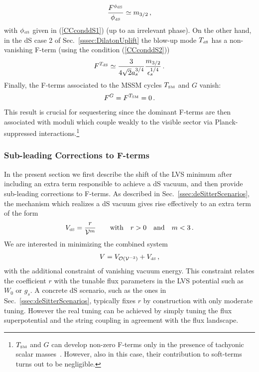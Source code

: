 \documentclass[12pt,a4paper]{book}
\def\SM{{\scriptscriptstyle \rm SM}}
\def\dS{{\scriptscriptstyle \rm dS}}
\newcommand{\mc}{\mathcal}
\begin{document}
\begin{align}
\frac{F^{\phi_\dS}}{\phi_\dS} \simeq m_{3/2}\,,
\end{align}
with $\phi_\dS$ given in (\ref{CCconddS1}) (up to an irrelevant phase). On the other hand, in the dS case 2 of Sec.~\ref{sssec:DilatonUplift} the blow-up mode $T_\dS$ has a non-vanishing F-term (using the condition (\ref{CCconddS2}))
\begin{align}
F^{T_\dS} \simeq \frac{3}{4\sqrt{2}a_s^{3/4}}\frac{m_{3/2}}{\epsilon_s^{1/4}} \,.
\end{align}
Finally, the F-terms associated to the MSSM cycles $T_\SM$ and $G$ vanish:
\begin{align}
F^G = F^{T_\SM} = 0\, .
\end{align}
This result is crucial for sequestering since the dominant F-terms are then associated with moduli which couple weakly to the visible sector via Planck-suppressed interactions.\footnote{$T_\SM$ and $G$ can develop non-zero F-terms only in the presence of tachyonic scalar masses~\cite{Cicoli:2013cha}. However, also in this case, their contribution to soft-terms turns out to be negligible.}

\subsubsection{Sub-leading Corrections to F-terms}
\label{sssec:SubleadingCorrectionsToFTerms}

In the present section we first describe the shift of the LVS minimum after including an extra term responsible to achieve a dS vacuum, and then provide sub-leading corrections to F-terms. As described in Sec.~\ref{ssec:deSitterScenarios}, the mechanism which realizes a dS vacuum gives rise effectively to an extra term of the form
\begin{align}
V_\dS=\frac{r}{\mathcal{V}^m}\qquad\text{with}\quad r>0\quad\text{and}\quad m<3\,.
\end{align}
We are interested in minimizing the combined system
\begin{align}
V=V_{\mc{O}(\mathcal{V}^{-3})}+V_\dS\,,
\end{align}
with the additional constraint of vanishing vacuum energy. This constraint relates the coefficient $r$ with the tunable flux parameters in the LVS potential such as $W_0$ or $g_s$. A concrete dS scenario, such as the ones in Sec.~\ref{ssec:deSitterScenarios}, typically fixes $r$ by construction with only moderate tuning. However the real tuning can be achieved by simply tuning the flux superpotential and the string coupling in agreement with the flux landscape.\\
\end{document}
